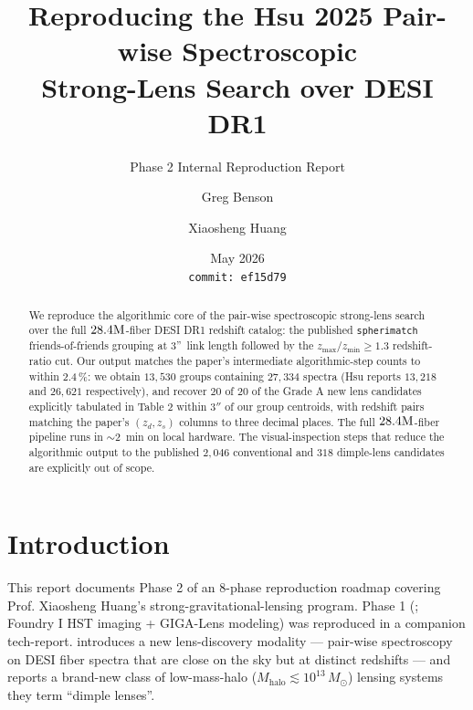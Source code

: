 \documentclass[11pt,letterpaper]{article}
\title{Reproducing the Hsu 2025 Pair-wise Spectroscopic\\
       Strong-Lens Search over DESI DR1}
\author{Greg Benson \and Xiaosheng Huang}
\date{May 2026 \\ \texttt{commit:~ef15d79}}
\newcommand{\Mhalo}{\ensuremath{M_{\mathrm{halo}}}}
\newcommand{\Msun}{\ensuremath{M_\odot}}
\begin{document}
\maketitle
\subtitle{Phase 2 Internal Reproduction Report}

\begin{abstract}
We reproduce the algorithmic core of the \citet{hsu2025pairwise} pair-wise
spectroscopic strong-lens search over the full $28.4{\rm M}$-fiber DESI
DR1 redshift catalog: the published \texttt{spherimatch}
friends-of-friends grouping at 3''\ link length followed by the
$z_{\max}/z_{\min} \geq 1.3$ redshift-ratio cut. Our output matches the
paper's intermediate algorithmic-step counts to within 2.4\,\%: we
obtain $13{,}530$ groups containing $27{,}334$ spectra (Hsu reports
$13{,}218$ and $26{,}621$ respectively), and recover $20$ of $20$ of the
Grade A new lens candidates explicitly tabulated in
\citet{hsu2025pairwise} Table 2 within $3''$ of our group centroids,
with redshift pairs matching the paper's $(z_d, z_s)$ columns to three
decimal places. The full $28.4{\rm M}$-fiber pipeline runs in $\sim$2~min
on local hardware. The visual-inspection steps that reduce the
algorithmic output to the published $2{,}046$ conventional and $318$
dimple-lens candidates are explicitly out of scope.
\end{abstract}

\tableofcontents

\bigskip

\section{Introduction}

This report documents Phase 2 of an 8-phase reproduction roadmap covering
Prof. Xiaosheng Huang's strong-gravitational-lensing program. Phase 1
(\citealt{huang2025foundry1}; Foundry I HST imaging + GIGA-Lens modeling)
was reproduced in a companion tech-report. \citet{hsu2025pairwise}
introduces a new lens-discovery modality — pair-wise spectroscopy on
DESI fiber spectra that are close on the sky but at distinct redshifts —
and reports a brand-new class of low-mass-halo
($\Mhalo \lesssim 10^{13}\,\Msun$) lensing systems they term
``dimple lenses''.
\end{document}
